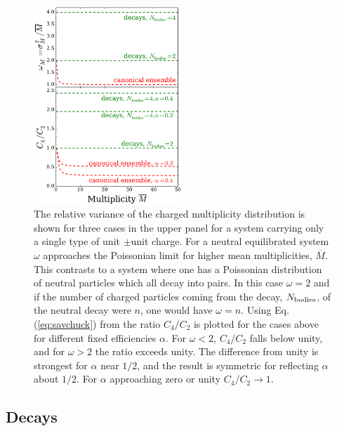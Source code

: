 \documentclass[aps,prc,nofootinbib,showpacs,superscriptaddress,groupedaddress]{revtex4-1}
\begin{document}
\begin{figure}
\centerline{\includegraphics[width=0.5\textwidth]{figs/savchuck}}
\caption{\label{fig:savchuck}
The relative variance of the charged multiplicity distribution is shown for three cases in the upper panel for a system carrying only a single type of unit $\pm$unit charge. For a neutral equilibrated system $\omega$ approaches the Poissonian limit for higher mean multiplicities, $\overline{M}$. This contrasts to a system where one has a Poissonian distribution of neutral particles which all decay into pairs. In this case $\omega=2$ and if the number of charged particles coming from the decay, $N_{\rm bodies}$, of the neutral decay were $n$, one would have $\omega=n$. Using Eq. (\ref{eq:savchuck}) from \cite{savchuck} the ratio $C_4/C_2$ is plotted for the cases above for different fixed efficiencies $\alpha$. For $\omega<2$, $C_4/C_2$ falls below unity, and for $\omega>2$ the ratio exceeds unity. The difference from unity is strongest for $\alpha$ near $1/2$, and the result is symmetric for reflecting $\alpha$ about $1/2$. For $\alpha$ approaching zero or unity $C_4/C_2\rightarrow 1$.}
\end{figure}

\subsection{Decays}
\end{document}
